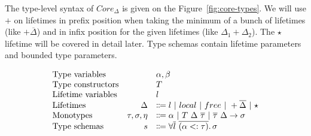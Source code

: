 \documentclass[11pt]{article}
\newcommand{\vor}{~|~}
\newcommand{\ap}{~}
\begin{document}
    The type-level syntax of $Core_\Delta$ is given on the Figure\ \ref{fig:core-types}.
    We will use $+$ on lifetimes in prefix position when taking the minimum of a bunch of lifetimes (like $+\overline{\Delta}$) and in infix position for the given lifetimes (like $\Delta_1 + \Delta_2$).
    The $\star$ lifetime will be covered in detail later. %
    Type schemas contain lifetime parameters and bounded type parameters.

    \begin{figure}
        \[
            \begin{array}{lrl}
                \text{Type variables}           &                    & \alpha, \beta                                                                                                      \\
                \text{Type constructors}        &                    & T                                                                                                                  \\
                \text{Lifetime variables}       &                    & l                                                                                                                  \\
                \text{Lifetimes}                & \Delta             & \Coloneqq l \vor local \vor free \vor +\overline{\Delta} \vor \star                                                \\
                \text{Monotypes}                & \tau, \sigma, \eta & \Coloneqq \alpha \vor T \ap \Delta \ap \overline{\tau} \vor \overline{\tau}~\Delta \to \sigma                      \\
                \text{Type schemas}             & s                  & \Coloneqq \forall \overline{l}~\overline{(\alpha <: \tau)}\ldotp \sigma                                            \\

\end{array}\]
\end{figure}
\end{document}
